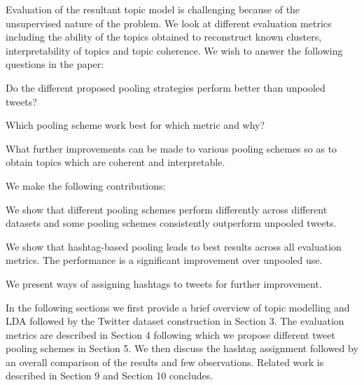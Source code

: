\documentclass[10pt,a5paper,twoside]{article}
\begin{document}
Evaluation of the resultant topic model is challenging because of the unsupervised nature of the problem. We look at different evaluation metrics 
including the ability of the topics obtained to reconstruct known clusters, 
interpretability of topics and topic coherence. We wish to answer the following questions in the paper:
\begin{compactitem}
\item Do the different proposed pooling strategies perform better than unpooled tweets?
\item Which pooling scheme work best for which metric and why?
\item What further improvements can be made to various pooling schemes so as to obtain topics which are coherent and interpretable.
\end{compactitem}
We make the following contributions:
\begin{compactitem}
\item We show that different pooling schemes perform differently across different datasets and some pooling schemes consistently outperform unpooled tweets.
\item We show that hashtag-based pooling leads to best results across all evaluation metrics.  The performance is a significant improvement over unpooled use.
\item We present ways of assigning hashtags to tweets for further improvement.
\end{compactitem}

In the following sections we first provide a brief overview of topic modelling and LDA followed by the Twitter dataset construction in Section 3. The evaluation metrics are described in Section 4 following which we propose different tweet pooling schemes in Section 5. We then discuss the hashtag assignment followed by an overall comparison of the results and few observations. Related work is described in Section 9 and Section 10 concludes. %
\end{document}
